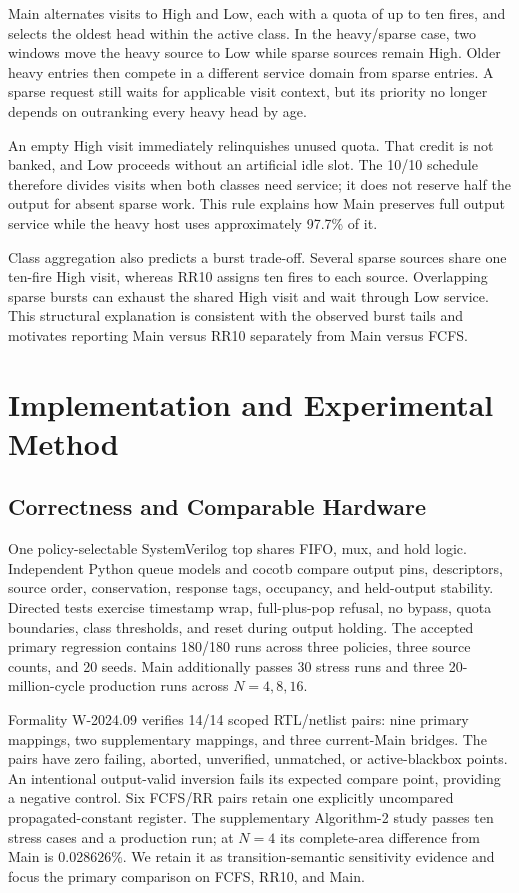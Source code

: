 Main alternates visits to High and Low, each with a quota of up to ten fires,
and selects the oldest head within the active class. In the heavy/sparse case,
two windows move the heavy source to Low while sparse sources remain High.
Older heavy entries then compete in a different service domain from sparse
entries. A sparse request still waits for applicable visit context, but its
priority no longer depends on outranking every heavy head by age.

An empty High visit immediately relinquishes unused quota. That credit is not
banked, and Low proceeds without an artificial idle slot. The 10/10 schedule
therefore divides visits when both classes need service; it does not reserve
half the output for absent sparse work. This rule explains how Main preserves
full output service while the heavy host uses approximately 97.7\% of it.

Class aggregation also predicts a burst trade-off. Several sparse sources
share one ten-fire High visit, whereas RR10 assigns ten fires to each source.
Overlapping sparse bursts can exhaust the shared High visit and wait through
Low service. This structural explanation is consistent with the observed
burst tails and motivates reporting Main versus RR10 separately from Main
versus FCFS.

\section{Implementation and Experimental Method}
\subsection{Correctness and Comparable Hardware}
One policy-selectable SystemVerilog top shares FIFO, mux, and hold logic.
Independent Python queue models and cocotb compare output pins, descriptors,
source order, conservation, response tags, occupancy, and held-output stability.
Directed tests exercise timestamp wrap, full-plus-pop refusal, no bypass, quota
boundaries, class thresholds, and reset during output holding. The accepted
primary regression contains 180/180 runs across three policies, three source
counts, and 20 seeds. Main additionally passes 30 stress runs and three
20-million-cycle production runs across $N=4,8,16$.

Formality W-2024.09 verifies 14/14 scoped RTL/netlist pairs: nine primary
mappings, two supplementary mappings, and three current-Main bridges. The pairs
have zero failing, aborted, unverified, unmatched, or active-blackbox points.
An intentional output-valid inversion fails its expected compare point,
providing a negative control. Six FCFS/RR pairs retain one explicitly
uncompared propagated-constant register. The supplementary Algorithm-2 study
passes ten stress cases and a production run; at $N=4$ its complete-area
difference from Main is 0.028626\%. We retain it as transition-semantic
sensitivity evidence and focus the primary comparison on FCFS, RR10, and Main.

